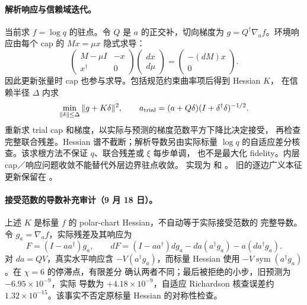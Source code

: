 \paragraph{解析响应与信赖域迭代。}
当前求 $f=\log q$ 的驻点。令 $Q$ 是 $a$ 的正交补，切向梯度为
$g=Q^\dagger\nabla_a f$。环境响应由每个 cap 的 $Mx=\mu x$ 隐式求导：
\begin{equation}
 \begin{pmatrix}M-\mu I&-x\\x^\dagger&0\end{pmatrix}
 \begin{pmatrix}dx\\d\mu\end{pmatrix}
 =\begin{pmatrix}-(dM)x\\0\end{pmatrix}.
\end{equation}
因此更新张量时 cap 也参与求导。包括规范约束曲率项后得到 Hessian $K$，
在信赖半径 $\Delta$ 内求
\begin{equation}
 \min_{\|\delta\|\leq\Delta}\|g+K\delta\|^2,\qquad
 a_{\rm trial}=(a+Q\delta)(I+\delta^\dagger\delta)^{-1/2}.
\end{equation}
重新求 trial cap 和梯度，以实际与预测的梯度范数平方下降比决定接受，
再检查完整联合残差。Hessian 谱不截断；解析导数另由实际标量 $\log q$
的自适应差分核查。该求根方法不保证 $q$、联合残差或 $\xi$ 每步单调，
也不是最大化 fidelity。内层 cap／响应问题收敛不能替代外层边界驻点收敛。
实现为  和
。
旧的逐边广义本征更新保留在 。

\paragraph{接受范数的导数补充审计（9 月 18 日）。}
上述 $K$ 是标量 $f$ 的 polar-chart Hessian，不自动等于实际接受范数的
完整导数。令 $g_a=\nabla_a f$，实际残差及其响应为
\begin{equation}
 F=(I-aa^\dagger)g_a,\qquad
 dF=(I-aa^\dagger)dg_a-da(a^\dagger g_a)-a(da^\dagger g_a).
\end{equation}
对 $da=QV$，真实水平响应含 $-V(a^\dagger g_a)$，而标量 Hessian 使用
$-V\operatorname{sym}(a^\dagger g_a)$。在 $\chi=6$ 的停滞点，有限差分
确认两者不同；最后被拒绝的小步，旧预测为 $-6.95\times10^{-9}$，实际
导数为 $+4.18\times10^{-9}$，自适应 Richardson 核查误差约
$1.32\times10^{-15}$。该事实不否定原标量 Hessian 的对称性检查。

